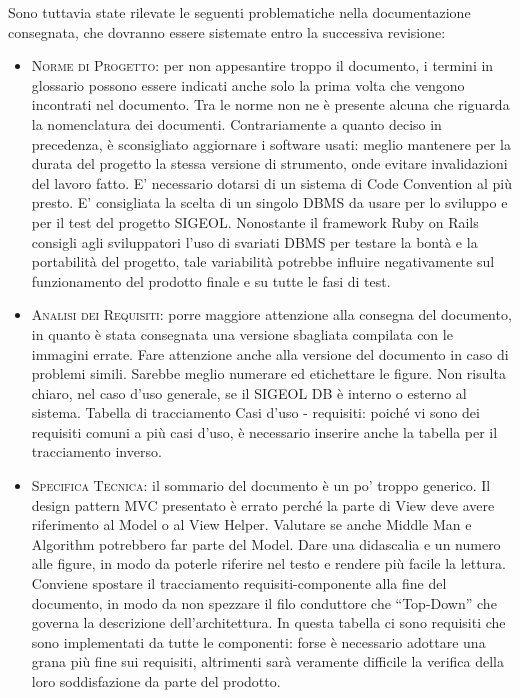 \documentclass[11pt,a4paper]{article}
\begin{document}
Sono tuttavia state rilevate le seguenti problematiche nella documentazione consegnata, che dovranno essere sistemate entro la successiva revisione:
\begin{itemize}
\item \textsc{Norme di Progetto:} per non appesantire troppo il documento, i termini in glossario possono essere indicati anche solo la
prima volta che vengono incontrati nel documento.
Tra le norme non ne è presente alcuna che riguarda la nomenclatura dei documenti.
Contrariamente a quanto deciso in precedenza, è sconsigliato aggiornare i software usati: meglio mantenere per la durata del progetto la stessa versione di strumento, onde evitare invalidazioni del lavoro fatto.
E' necessario dotarsi di un sistema di Code Convention al più presto.
E' consigliata la scelta di un singolo DBMS da usare per lo sviluppo e per il test del progetto SIGEOL. Nonostante il framework Ruby on Rails consigli agli sviluppatori l'uso di svariati DBMS per testare la bontà e la portabilità del progetto, tale variabilità potrebbe influire negativamente sul funzionamento del prodotto finale e su tutte le fasi di test.
\item \textsc{Analisi dei Requisiti:} porre maggiore attenzione alla consegna del documento, in quanto è stata consegnata una versione sbagliata compilata con le immagini errate. Fare attenzione anche alla versione del documento in caso di problemi simili.
Sarebbe meglio numerare ed etichettare le figure.
Non risulta chiaro, nel caso d'uso generale, se il SIGEOL DB è interno o esterno al sistema.
Tabella di tracciamento Casi d'uso - requisiti: poiché vi sono dei requisiti comuni a più casi d'uso, è necessario inserire anche la tabella per il tracciamento inverso.
\item \textsc{Specifica Tecnica:} il sommario del documento è un po' troppo generico.
Il design pattern MVC presentato è errato perché la parte di View deve avere riferimento al Model o al View Helper.
Valutare se anche Middle Man e Algorithm potrebbero far parte del Model.
Dare una didascalia e un numero alle figure, in modo da poterle riferire nel testo e rendere più facile la lettura.
Conviene spostare il tracciamento requisiti-componente alla fine del documento, in modo da non spezzare il filo conduttore che “Top-Down” che governa la descrizione dell'architettura. In questa tabella ci sono requisiti che sono implementati da tutte le componenti: forse è necessario adottare una grana più fine sui requisiti, altrimenti sarà veramente difficile la verifica della loro soddisfazione da parte del prodotto.

\end{itemize}
\end{document}
